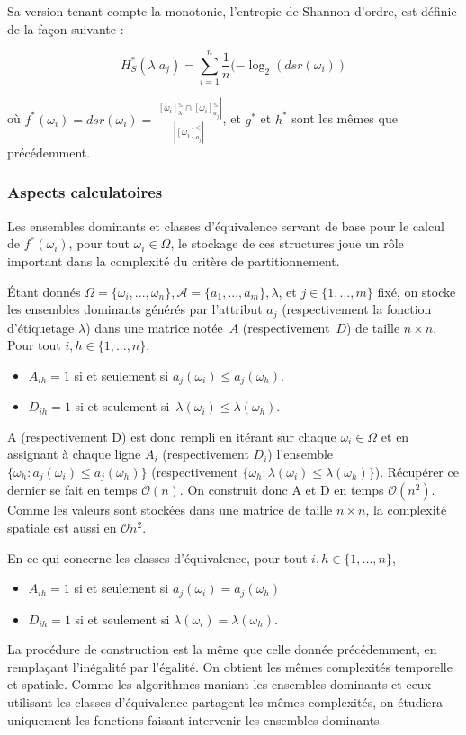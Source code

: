 \documentclass[a4paper]{article}
\begin{document}
Sa version tenant compte la monotonie, l'entropie de Shannon d'ordre, est
définie de la façon suivante :

\begin{equation}
    H^*_S(\lambda | a_j) = \sum_{i=1}^{n} \frac{1}{n} (-\log_{2} (dsr(\omega_i))
\label{eq:rank-shannon}
\end{equation}

où $f^*(\omega_i) = dsr(\omega_i) = \frac{|[\omega_i]^{\leq}_{\lambda} \cap
[\omega_i]^{\leq}_{a_j}|}{|[\omega_i]^{\leq}_{a_j}|}$, et $g^*$ et $h^*$ sont
les mêmes que précédemment. \\

\subsubsection{Aspects calculatoires}

Les ensembles dominants et classes d'équivalence servant de base pour le calcul
de $f^*(\omega_i)$, pour tout $\omega_i \in \Omega$, le stockage de ces
structures joue un rôle important dans la complexité du critère de
partitionnement.

Étant donnés $\Omega = \{\omega_i, ... , \omega_n\}, \mathcal{A} = \{a_1, ...,
a_m\}, \lambda$, et $j \in \{1, ..., m\}$ fixé, on stocke les ensembles
dominants générés par l'attribut $a_j$ (respectivement la fonction d'étiquetage $\lambda$) dans une matrice notée~$A$ (respectivement~$D$) de taille $n \times n$. Pour tout $i,
h \in \{1,...,n\}$,
\begin{itemize} 
    \item $A_{ih} = 1$ si et seulement si $a_j(\omega_i) \leq
    a_j(\omega_h)$.
    \item $D_{ih}= 1$ si et seulement si~$\lambda(\omega_i) \leq \lambda(\omega_h)$.
\end{itemize}
A (respectivement D) est donc rempli en itérant sur chaque $\omega_i \in \Omega$
et en assignant à chaque ligne $A_i$ (respectivement $D_i$) l'ensemble
$\{\omega_h : a_j(\omega_i) \leq a_j(\omega_h)\}$ (respectivement $\{\omega_h :
\lambda(\omega_i) \leq \lambda(\omega_h)\}$). Récupérer ce dernier se fait en
temps $\mathcal{O}(n)$. On construit donc A et D en temps $\mathcal{O}(n^2)$.
Comme les valeurs sont stockées dans une matrice de taille $n \times n$, la
complexité spatiale est aussi en $\mathcal{O}{n^2}$.

En ce qui concerne les classes d'équivalence, pour tout $i, h \in \{1,...,n\}$,
\begin{itemize}
    \item $A_{ih} = 1$ si et seulement si $a_j(\omega_i) = a_j(\omega_h)$
    \item $D_{ih} = 1$ si et seulement si $\lambda(\omega_i) = \lambda(\omega_h)$. 
\end{itemize}
La procédure de construction est la même que celle donnée
précédemment, en remplaçant l'inégalité par l'égalité. On obtient les mêmes
complexités temporelle et spatiale. Comme les algorithmes maniant les ensembles
dominants et ceux utilisant les classes d'équivalence partagent les mêmes
complexités, on étudiera uniquement les fonctions faisant intervenir les
ensembles dominants. 
\end{document}
